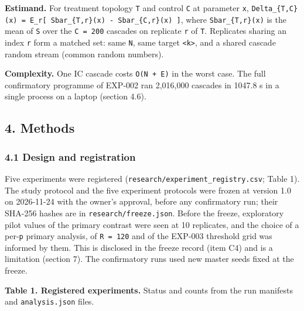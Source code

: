 \documentclass[
]{article}
\begin{document}
\textbf{Estimand.} For treatment topology \texttt{T} and control
\texttt{C} at parameter \texttt{x},
\texttt{Delta\_\{T,C\}(x)\ =\ E\_r{[}\ Sbar\_\{T,r\}(x)\ -\ Sbar\_\{C,r\}(x)\ {]}},
where \texttt{Sbar\_\{T,r\}(x)} is the mean of \texttt{S} over the
\texttt{C\ =\ 200} cascades on replicate \texttt{r} of \texttt{T}.
Replicates sharing an index \texttt{r} form a matched set: same
\texttt{N}, same target \texttt{\textless{}k\textgreater{}}, and a
shared cascade random stream (common random numbers).

\textbf{Complexity.} One IC cascade costs
\texttt{O(N\ +\ \textbar{}E\textbar{})} in the worst case. The full
confirmatory programme of EXP-002 ran 2,016,000 cascades in 1047.8 s in
a single process on a laptop (section 4.6).

\subsection{4. Methods}\label{methods}

\subsubsection{4.1 Design and
registration}\label{design-and-registration}

Five experiments were registered
(\texttt{research/experiment\_registry.csv}; Table 1). The study
protocol and the five experiment protocols were frozen at version 1.0 on
2026-11-24 with the owner's approval, before any confirmatory run; their
SHA-256 hashes are in \texttt{research/freeze.json}. Before the freeze,
exploratory pilot values of the primary contrast were seen at 10
replicates, and the choice of a per-\texttt{p} primary analysis, of
\texttt{R\ =\ 120} and of the EXP-003 threshold grid was informed by
them. This is disclosed in the freeze record (item C4) and is a
limitation (section 7). The confirmatory runs used new master seeds
fixed at the freeze.

\textbf{Table 1. Registered experiments.} Status and counts from the run
manifests and \texttt{analysis.json} files.
\end{document}
